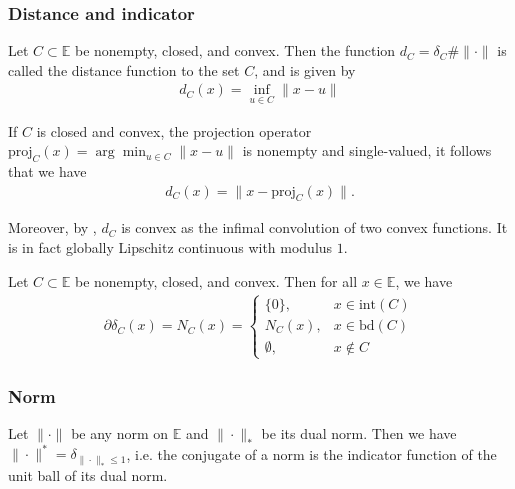 \documentclass{tufte-handout}
\begin{document}
\subsubsection{Distance and indicator}
\begin{Proposition}
    Let \( C \subset \mathbb{E} \) be nonempty, closed, and convex. Then the function 
    \(d_C = \delta_C \# \|\cdot\|\) is 
    called the distance function to the set \( C \), and is given by
    \begin{align}
        d_C(x) = \inf_{u\in C} \|x-u\|
    \end{align}
\end{Proposition}
If \( C \) is closed and convex, the projection operator \( \text{proj}_C(x) = \arg\min_{u\in C} \|x-u\| \)
is nonempty and single-valued, it follows that we have 
\begin{align}
    d_C(x) = \|x - \text{proj}_C(x)\|.
\end{align}

Moreover, by , \( d_C \) is convex as the infimal convolution of two convex functions.
It is in fact globally Lipschitz continuous with modulus \( 1 \).

\begin{Proposition}
    Let \( C \subset \mathbb{E} \) be nonempty, closed, and convex. Then for all \( x \in \mathbb{E} \), we have
    \begin{align}
        \partial \delta_C(x) = N_C(x) = \begin{cases}
        \{0\}, & x \in \text{int}(C)\\
        N_C(x), & x \in \text{bd}(C)\\
        \emptyset, & x \notin C
        \end{cases}
    \end{align}
\end{Proposition}

\subsubsection{Norm}
\begin{Proposition}
    Let \( \|\cdot\| \) be any norm on \( \mathbb{E} \) and \( \|\cdot\|_* \) be its dual norm.
    Then we have \( \|\cdot\|^* = \delta_{\|\cdot\|_* \le 1} \), i.e. the conjugate of a norm is the indicator function of the unit ball of its dual norm.
\end{Proposition}
\end{document}
